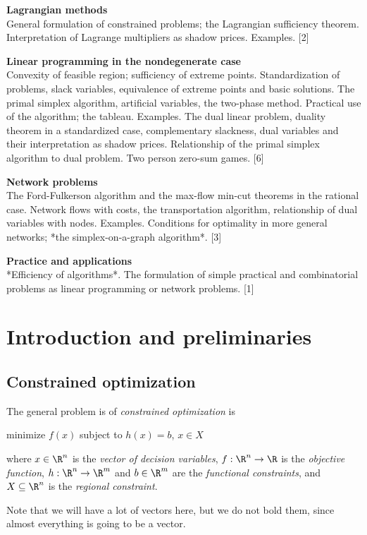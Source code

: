 \documentclass[a4paper]{article}
\begin{document}
\maketitle
{\small
\noindent\textbf{Lagrangian methods}\\
General formulation of constrained problems; the Lagrangian sufficiency theorem.  Interpretation of Lagrange multipliers as shadow prices. Examples.\hspace*{\fill} [2]

\vspace{10pt}
\noindent\textbf{Linear programming in the nondegenerate case}\\
Convexity of feasible region; sufficiency of extreme points. Standardization of problems, slack variables, equivalence of extreme points and basic solutions. The primal simplex algorithm, artificial variables, the two-phase method. Practical use of the algorithm; the tableau. Examples. The dual linear problem, duality theorem in a standardized case, complementary slackness, dual variables and their interpretation as shadow prices. Relationship of the primal simplex algorithm to dual problem. Two person zero-sum games.\hspace*{\fill} [6]

\vspace{10pt}
\noindent\textbf{Network problems}\\
The Ford-Fulkerson algorithm and the max-flow min-cut theorems in the rational case. Network flows with costs, the transportation algorithm, relationship of dual variables with nodes. Examples. Conditions for optimality in more general networks; *the simplex-on-a-graph algorithm*.\hspace*{\fill} [3]

\vspace{10pt}
\noindent\textbf{Practice and applications}\\
*Efficiency of algorithms*. The formulation of simple practical and combinatorial problems as linear programming or network problems.\hspace*{\fill} [1]}

\tableofcontents

\section{Introduction and preliminaries}
\subsection{Constrained optimization}
\begin{defi}
  The general problem is of \emph{constrained optimization} is
  \begin{center}
    minimize $f(x)$ subject to $h(x) = b$, $x\in X$
  \end{center}
  where $x\in \R^n$ is the \emph{vector of decision variables}, $f: \R^n \to \R$ is the \emph{objective function}, $h: \R^n \to \R^m$ and $b\in \R^m$ are the \emph{functional constraints}, and $X\subseteq \R^n$ is the \emph{regional constraint}.
\end{defi}
Note that we will have a lot of vectors here, but we do not bold them, since almost everything is going to be a vector.
\end{document}
